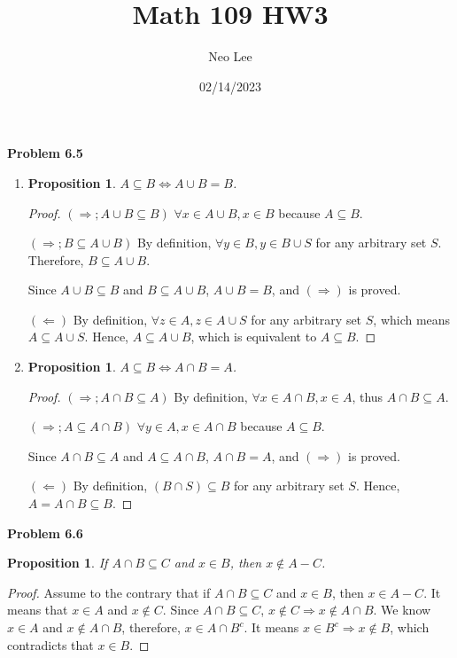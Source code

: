 \documentclass{article}
\title{Math 109 HW3}
\author{Neo Lee}
\date{02/14/2023}
\newtheorem{prop}[thm]{Proposition}
\begin{document}
 

\maketitle 

\textbf{Problem 6.5}
\begin{enumerate}[label={(\roman*)}]
    \item 
    \begin{prop}
        $A \subseteq B \Leftrightarrow A \cup B = B$.
    \end{prop}
    \begin{proof}
        $(\Rightarrow; A \cup B \subseteq B)$ $\forall x \in A \cup B, x \in B$ because $A \subseteq B$.

        $(\Rightarrow; B \subseteq A \cup B)$ By definition, $\forall y \in B, y \in B \cup S$ for any arbitrary set $S$. Therefore, $B \subseteq A \cup B$.
        
        Since $A \cup B \subseteq B$ and $B \subseteq A \cup B$, $A \cup B = B$, and $(\Rightarrow)$ is proved.

        $(\Leftarrow)$ By definition, $\forall z \in A, z \in A \cup S$ for any arbitrary set $S$, which means $A \subseteq A \cup S$.
        Hence, $A \subseteq A \cup B$, which is equivalent to $A \subseteq B$.
    \end{proof}

    \item 
    \begin{prop}
        $A \subseteq B \Leftrightarrow A \cap B = A$.
    \end{prop}
    \begin{proof}
        $(\Rightarrow; A \cap B \subseteq A)$ By definition, $\forall x \in A \cap B, x \in A$, thus $A \cap B \subseteq A$.

        $(\Rightarrow; A \subseteq A \cap B)$ $\forall y \in A, x \in A \cap B$ because $A \subseteq B$.

        Since $A \cap B \subseteq A$ and $A \subseteq A \cap B$, $A \cap B = A$, and $(\Rightarrow)$ is proved.

        $(\Leftarrow)$ By definition, $(B \cap S) \subseteq B$ for any arbitrary set $S$. 
        Hence, $A = A \cap B \subseteq B$.
    \end{proof}
\end{enumerate}
\bigbreak

\textbf{Problem 6.6}
\begin{prop}
    If $A \cap B \subseteq C$ and $x \in B$, then $x \not\in A-C$.
\end{prop}
\begin{proof}
    Assume to the contrary that if $A \cap B \subseteq C$ and $x \in B$, then $x \in A-C$. 
    It means that $x \in A$ and $x \not \in C$. Since $A \cap B \subseteq C$, $x \not \in C \Rightarrow x \not \in A \cap B$.
    We know $x \in A$ and $x \not \in A \cap B$, therefore, $x \in A \cap B^c$. 
    It means $x \in B^c \Rightarrow x \not \in B$, which contradicts that $x \in B$.
\end{proof}
\bigbreak
\end{document}
